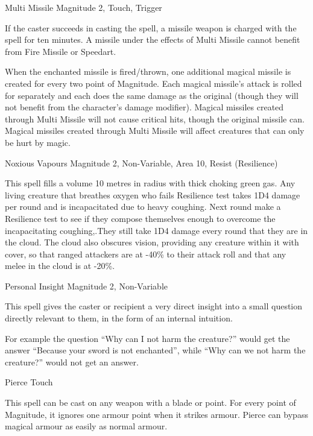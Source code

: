 \begin{rpg-spell}
{Multi Missile}
{Magnitude 2, Touch, Trigger}

If the caster succeeds in casting the spell, a missile weapon is charged with the spell for ten minutes. A missile under the effects of Multi Missile cannot benefit from Fire Missile or Speedart. 

When the enchanted missile is fired/thrown, one additional magical missile is created for every two point of Magnitude. Each magical missile’s attack is rolled for separately and each does the same damage as the original (though they will not benefit from the character’s damage modifier). Magical missiles created through Multi Missile will not cause critical hits, though the original missile can. Magical missiles created through Multi Missile will affect creatures that can only be hurt by magic. 
\end{rpg-spell}


\begin{rpg-spell}
{Noxious Vapours}
{Magnitude 2, Non-Variable, Area 10, Resist (Resilience)}

This spell fills a volume 10 metres in radius with thick choking green gas. Any living creature that breathes oxygen who fails Resilience test takes 1D4 damage per round and is incapacitated due to heavy coughing. Next round make a Resilience test to see if they compose themselves enough to overcome the incapacitating coughing,.They still take 1D4 damage every round that they are in the cloud. The cloud also obscures vision, providing any creature within it with cover, so that ranged attackers are at -40\% to their attack roll and that any melee in the cloud is at -20\%.
\end{rpg-spell}


\begin{rpg-spell}
{Personal Insight}
{Magnitude 2, Non-Variable}

This spell gives the caster or recipient a very direct insight into a small question directly relevant to them, in the form of an internal intuition.

For example the question “Why can I not harm the creature?” would get the answer “Because your sword is not enchanted”, while “Why can we not harm the creature?” would not get an answer.
\end{rpg-spell}


\begin{rpg-spell}
{Pierce}
{Touch}

This spell can be cast on any weapon with a blade or point. For every point of Magnitude, it ignores one armour point when it strikes armour. Pierce can bypass magical armour as easily as normal armour. 
\end{rpg-spell}


